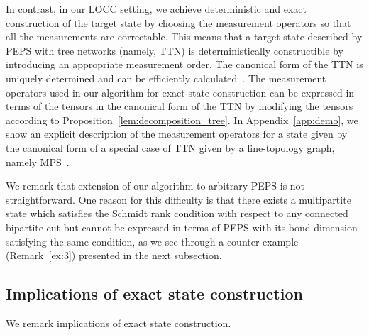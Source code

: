 \documentclass[preprintnumbers,aps,amsmath,amssymb,pra,twocolumn,showpacs,superscriptaddress,floatfix]{revtex4-1}
\theoremstyle{plain}
\theoremstyle{definition}
\theoremstyle{remark}
\begin{document}
In contrast, in our LOCC setting, we achieve deterministic and exact construction of the target state by choosing the measurement operators so that all the measurements are correctable.  This means that a target state described by PEPS with tree networks (namely, TTN) is deterministically constructible by introducing an appropriate measurement order. The canonical form of the TTN is uniquely determined and can be efficiently calculated~\cite{PRA022320}.  The measurement operators used in our algorithm for exact state construction can be expressed in terms of the tensors in the canonical form of the TTN by modifying the tensors according to Proposition~\ref{lem:decomposition_tree}.   In Appendix~\ref{app:demo}, we show an explicit description of the measurement operators for a state given by the canonical form of a special case of TTN given by a line-topology graph, namely MPS~\cite{APractical}.


We remark that extension of our algorithm to arbitrary PEPS is not straightforward.
One reason for this difficulty is that there exists a multipartite state which satisfies the Schmidt rank condition with respect to any connected bipartite cut but cannot be expressed in terms of PEPS with its bond dimension satisfying the same condition, as we see through a counter example (Remark~\ref{ex:3}) presented in the next subsection.


\subsection{Implications of exact state construction}

We remark implications of exact state construction.
\end{document}
